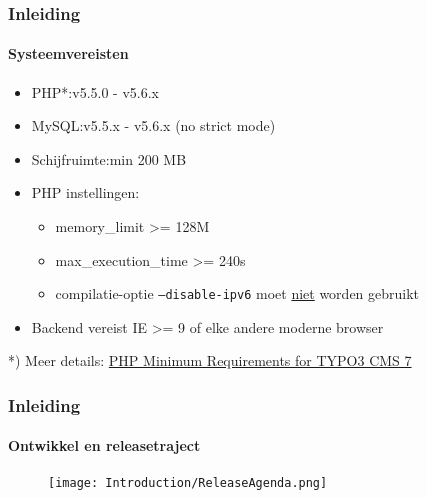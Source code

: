 
\begin{frame}[fragile]
	\frametitle{Inleiding}
	\framesubtitle{Systeemvereisten}

	\begin{itemize}
		\item PHP*:\tabto{2.2cm}v5.5.0 - v5.6.x
		\item MySQL:\tabto{2.2cm}v5.5.x - v5.6.x (no strict mode)
		\item Schijfruimte:\tabto{2.2cm}min 200 MB
		\item PHP instellingen:

			\begin{itemize}
				\item memory\_limit >= 128M
				\item max\_execution\_time >= 240s
				\item compilatie-optie \texttt{--disable-ipv6} moet \underline{niet} worden gebruikt
			\end{itemize}

		\item Backend vereist IE >= 9 of elke andere moderne browser

	\end{itemize}

	\vspace{1cm}
	*) Meer details: \href{http://typo3.org/news/article/php-minimum-requirements-for-typo3-cms-7/}{PHP Minimum Requirements for TYPO3 CMS 7}

\end{frame}


\begin{frame}[fragile]
	\frametitle{Inleiding}
	\framesubtitle{Ontwikkel en releasetraject}

	\begin{figure}
		\texttt{[image: Introduction/ReleaseAgenda.png]}
	\end{figure}

\end{frame}


